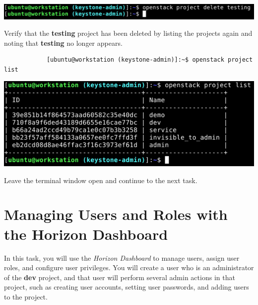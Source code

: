 \documentclass[letterpaper, 12pt]{article}
\begin{document}
\begin{enumerate}
\begin{labstep}
        \begin{center}
            \includegraphics[width=\linewidth]{images/part2/step7.png}
        \end{center}
    \end{labstep}

    \begin{labstep}
        Verify that the \textbf{testing} project has been deleted by listing the projects again and noting that
        \textbf{testing} no longer appears.
        \begin{lstlisting}
            [ubuntu@workstation (keystone-admin)]:~$ openstack project list
        \end{lstlisting}

        \begin{center}
            \includegraphics[width=\linewidth]{images/part2/step8.png}
        \end{center}
    \end{labstep}

    \begin{labstep}
        Leave the terminal window open and continue to the next task.
    \end{labstep}
\end{enumerate}

\section{Managing Users and Roles with the Horizon Dashboard}\label{sec:managing_users_using_the_horizon_dashboard}
In this task, you will use the \textit{Horizon Dashboard} to manage users, assign user roles, and configure user privileges.
You will create a user who is an administrator of the \textbf{dev} project, and that user will perform several admin actions in that project, such as creating user accounts, setting user passwords, and adding users to the project.
\end{document}
